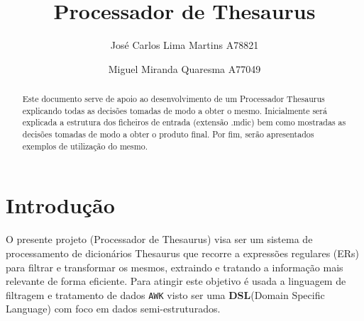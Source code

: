 \documentclass{llncs}
\begin{document}
\mainmatter
\title{Processador de Thesaurus}
\author{José Carlos Lima Martins A78821 \and
        Miguel Miranda Quaresma A77049}

\maketitle

\justify

\begin{abstract}
Este documento serve de apoio ao desenvolvimento de um Processador Thesaurus explicando todas as decisões tomadas de modo a obter o mesmo. Inicialmente será explicada a estrutura dos ficheiros de entrada (extensão .mdic) bem como mostradas as decisões tomadas de modo a obter o produto final. Por fim, serão apresentados exemplos de utilização do mesmo.
\end{abstract}

\section{Introdução}
O presente projeto (Processador de Thesaurus) visa ser um sistema de processamento de dicionários Thesaurus que recorre a expressões regulares (ERs) para filtrar e transformar os mesmos, extraindo e tratando a informação mais relevante de forma eficiente. Para atingir este objetivo é usada a linguagem de filtragem e tratamento de dados \texttt{AWK} visto ser uma \textbf{DSL}(Domain Specific Language) com foco em dados semi-estruturados.
\end{document}
